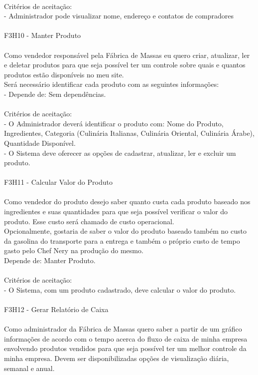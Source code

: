 \\
\tab Critérios de aceitação:\\
\tab - Administrador pode visualizar nome, endereço e contatos de compradores\\
\\
F3H10 - Manter Produto\\
\\
\tab Como vendedor responsável pela Fábrica de Massas eu quero criar, atualizar, ler e deletar produtos para que seja possível ter um controle sobre quais e quantos produtos estão disponíveis no meu site.\\
\tab Será necessário identificar cada produto com as seguintes informações:\\
\tab - Depende de: Sem dependências.\\
\\
\tab Critérios de aceitação:\\
\tab - O Administrador deverá identificar o produto com: Nome do Produto, Ingredientes, Categoria (Culinária Italianas, Culinária Oriental, Culinária Árabe), Quantidade Disponível.\\
\tab - O Sistema deve oferecer as opções de cadastrar, atualizar, ler e excluir um produto.\\
\\
F3H11 - Calcular Valor do Produto\\
\\
\tab Como vendedor do produto desejo saber quanto custa cada produto baseado nos ingredientes e suas quantidades para que seja possível verificar o valor do produto. Esse custo será chamado de custo operacional.\\
\tab Opcionalmente, gostaria de saber o valor do produto baseado também no custo da gasolina do transporte para a entrega e também o próprio custo de tempo gasto pelo Chef Nery na produção do mesmo.\\
\tab Depende de: Manter Produto.\\
\\
\tab Critérios de aceitação:\\
\tab - O Sistema, com um produto cadastrado, deve calcular o valor do produto.\\
\\
F3H12 - Gerar Relatório de Caixa\\
\\
\tab Como administrador da Fábrica de Massas quero saber a partir de um gráfico informações de acordo com o tempo acerca do fluxo de caixa de minha empresa envolvendo produtos vendidos para que seja possível ter um melhor controle da minha empresa. Devem ser disponibilizadas opções de visualização diária, semanal e anual.\\
